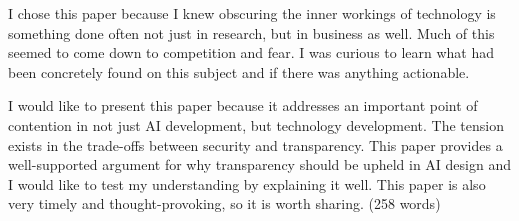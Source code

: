 \documentclass[12pt, letterpaper]{article}
\begin{document}
I chose this paper because I knew obscuring the inner workings of technology is something done often not just in research, but in business as well. Much of this seemed to come down to competition and fear. I was curious to learn what had been concretely found on this subject and if there was anything actionable.

I would like to present this paper because it addresses an important point of contention in not just AI development, but technology development. The tension exists in the trade-offs between security and transparency. This paper provides a well-supported argument for why transparency should be upheld in AI design and I would like to test my understanding by explaining it well. This paper is also very timely and thought-provoking, so it is worth sharing. (258 words)
\end{document}
